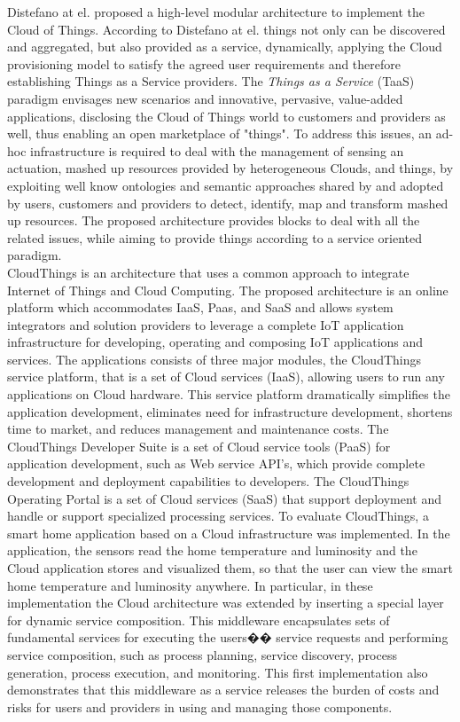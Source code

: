 Distefano \cite{distefano2012enabling} at el. proposed a high-level modular architecture to implement the Cloud of Things. According to Distefano at el. things
not only can be discovered and aggregated, but also provided as a service, dynamically, applying the Cloud provisioning model to satisfy the agreed
user requirements and therefore establishing Things as a Service providers. The \textit{Things as a Service} (TaaS) paradigm envisages new scenarios
and innovative, pervasive, value-added applications, disclosing the Cloud of Things world to customers and providers as well, thus enabling an open
marketplace of "things". To address this issues, an ad-hoc infrastructure is required to deal with the management of sensing an actuation, mashed up
resources provided by heterogeneous Clouds, and things, by exploiting well know ontologies and semantic approaches shared by and adopted by users,
customers and providers to detect, identify, map and transform mashed up resources. The proposed architecture provides blocks to deal with all the
related issues, while aiming to provide things according to a service oriented paradigm.\\

CloudThings \cite{zhou2013cloudthings} is an architecture that uses a common approach to integrate Internet of Things and Cloud Computing. The proposed architecture
is an online platform which accommodates IaaS, Paas, and SaaS and allows system integrators and solution providers to leverage a complete IoT application
infrastructure for developing, operating and composing IoT applications and services. The applications consists of three major modules, the CloudThings
service platform, that is a set of Cloud services (IaaS), allowing users to run any applications on Cloud hardware. This service platform dramatically
simplifies the application development, eliminates need for infrastructure development, shortens time to market, and reduces management and maintenance
costs. The CloudThings Developer Suite is a set of Cloud service tools (PaaS) for application development, such as Web service API's, which provide complete
development and deployment capabilities to developers. The CloudThings Operating Portal is a set of Cloud services (SaaS) that support deployment and handle
or support specialized processing services. To evaluate CloudThings, a smart home application based on a Cloud infrastructure was implemented. In the application,
the sensors read the home temperature and luminosity and the Cloud application stores and visualized them, so that the user can view the smart home temperature and luminosity
anywhere. In particular, in these implementation the Cloud architecture was extended by inserting a special layer for dynamic service composition.
This middleware encapsulates sets of fundamental services for executing the users�� service requests and performing service composition, such as process planning,
service discovery, process generation, process execution, and monitoring. This first implementation also demonstrates that this middleware as a service
releases the burden of costs and risks for users and providers in using and managing those components.\\

